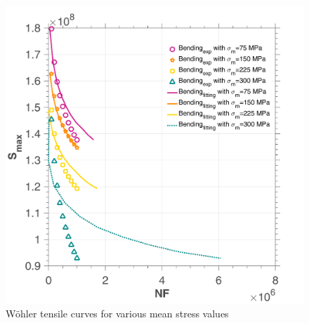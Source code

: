 \documentclass[3p,times,number,review]{elsarticle}
\begin{document}
\begin{figure}[!h]
	\centering
	\includegraphics[width=\textwidth]{figures//10HNAP_b1D_m_sn.png} 
	\caption{Wöhler tensile curves for various mean stress values}
	\label{fig.b1Dm10HNAPsn}
\end{figure}
\end{document}
